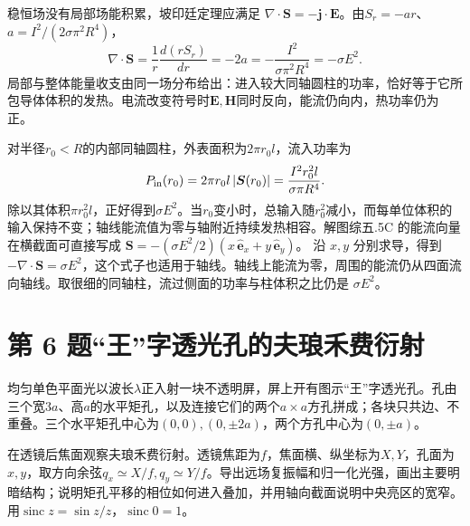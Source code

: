 \documentclass[UTF8,fontset=fandol,a4paper,11pt]{ctexart}
\begin{document}
稳恒场没有局部场能积累，坡印廷定理应满足
$\nabla\cdot\boldsymbol S=-\boldsymbol j\cdot\boldsymbol E$。由$S_r=-ar$、
$a=I^2/(2\sigma\pi^2R^4)$，
\[
\nabla\cdot\boldsymbol S
=\frac1r\frac{d(rS_r)}{dr}
=-2a=-\frac{I^2}{\sigma\pi^2R^4}
=-\sigma E^2.
\]
局部与整体能量收支由同一场分布给出：进入较大同轴圆柱的功率，恰好等于它所包导体体积的发热。电流改变符号时$\boldsymbol E,\boldsymbol H$同时反向，能流仍向内，热功率仍为正。

对半径$r_0<R$的内部同轴圆柱，外表面积为$2\pi r_0l$，流入功率为
\[
P_{\rm in}(r_0)=2\pi r_0l\,|\boldsymbol S(r_0)|
=\frac{I^2r_0^2l}{\sigma\pi R^4}.
\]
除以其体积$\pi r_0^2l$，正好得到$\sigma E^2$。当$r_0$变小时，总输入随$r_0^2$减小，而每单位体积的输入保持不变；轴线能流值为零与轴附近持续发热相容。解图综五.5C 的能流向量在横截面可直接写成
$\boldsymbol S=-(\sigma E^2/2)(x\,\hat{\boldsymbol e}_x+y\,\hat{\boldsymbol e}_y)$。
沿 $x,y$ 分别求导，得到 $-\nabla\cdot\boldsymbol S=\sigma E^2$，这个式子也适用于轴线。轴线上能流为零，周围的能流仍从四面流向轴线。取很细的同轴柱，流过侧面的功率与柱体积之比仍是 $\sigma E^2$。




\section*{第 6 题\quad “王”字透光孔的夫琅禾费衍射}\label{q:6}


均匀单色平面光以波长$\lambda$正入射一块不透明屏，屏上开有图示“王”字透光孔。孔由三个宽$3a$、高$a$的水平矩孔，以及连接它们的两个$a\times a$方孔拼成；各块只共边、不重叠。三个水平矩孔中心为$(0,0),(0,\pm2a)$，两个方孔中心为$(0,\pm a)$。

在透镜后焦面观察夫琅禾费衍射。透镜焦距为$f$，焦面横、纵坐标为$X,Y$，孔面为$x,y$，取方向余弦$q_x\simeq X/f,q_y\simeq Y/f$。导出远场复振幅和归一化光强，画出主要明暗结构；说明矩孔平移的相位如何进入叠加，并用轴向截面说明中央亮区的宽窄。用$\operatorname{sinc}z=\sin z/z$，$\operatorname{sinc}0=1$。
\end{document}

